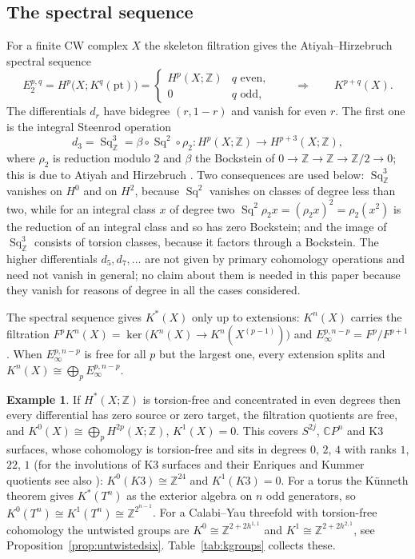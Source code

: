 \documentclass[reqno,11pt]{amsart}
\theoremstyle{definition}
\newtheorem{example}[theorem]{Example}
\newcommand{\ZZ}{\mathbb{Z}}
\newcommand{\CC}{\mathbb{C}}
\newcommand{\Sq}{\operatorname{Sq}}
\begin{document}
\subsection{The spectral sequence}
For a finite CW complex $X$ the skeleton filtration gives the Atiyah--Hirzebruch spectral sequence \cite{AH61}
\begin{equation}\label{eq:ahss}
E_2^{p,q}=H^p\bigl(X;K^q(\mathrm{pt})\bigr)=\begin{cases}H^p(X;\ZZ)&q\text{ even},\\ 0&q\text{ odd},\end{cases}\qquad\Longrightarrow\qquad K^{p+q}(X).
\end{equation}
The differentials $d_r$ have bidegree $(r,1-r)$ and vanish for even $r$. The first one is the integral Steenrod operation
\begin{equation}\label{eq:d3}
d_3=\Sq^3_\ZZ=\beta\circ\Sq^2\circ\rho_2\colon H^p(X;\ZZ)\longrightarrow H^{p+3}(X;\ZZ),
\end{equation}
where $\rho_2$ is reduction modulo $2$ and $\beta$ the Bockstein of $0\to\ZZ\to\ZZ\to\ZZ/2\to0$; this is due to Atiyah and Hirzebruch \cite{AH61}. Two consequences are used below: $\Sq^3_\ZZ$ vanishes on $H^0$ and on $H^2$, because $\Sq^2$ vanishes on classes of degree less than two, while for an integral class $x$ of degree two $\Sq^2\rho_2x=(\rho_2x)^2=\rho_2(x^2)$ is the reduction of an integral class and so has zero Bockstein; and the image of $\Sq^3_\ZZ$ consists of torsion classes, because it factors through a Bockstein. The higher differentials $d_5,d_7,\dots$ are not given by primary cohomology operations and need not vanish in general; no claim about them is needed in this paper because they vanish for reasons of degree in all the cases considered.

The spectral sequence gives $K^*(X)$ only up to extensions: $K^n(X)$ carries the filtration $F^pK^n(X)=\ker\bigl(K^n(X)\to K^n(X^{(p-1)})\bigr)$ and $E_\infty^{p,n-p}=F^p/F^{p+1}$. When $E_\infty^{p,n-p}$ is free for all $p$ but the largest one, every extension splits and $K^n(X)\cong\bigoplus_pE_\infty^{p,n-p}$.

\begin{example}\label{ex:even}
If $H^*(X;\ZZ)$ is torsion-free and concentrated in even degrees then every differential has zero source or zero target, the filtration quotients are free, and $K^0(X)\cong\bigoplus_pH^{2p}(X;\ZZ)$, $K^1(X)=0$. This covers $S^{2j}$, $\CC P^n$ and K3 surfaces, whose cohomology is torsion-free and sits in degrees $0$, $2$, $4$ with ranks $1$, $22$, $1$ \cite[Chapter~VIII]{BHPV04} (for the involutions of K3 surfaces and their Enriques and Kummer quotients see also \cite{BRB22,BN26}): $K^0(K3)\cong\ZZ^{24}$ and $K^1(K3)=0$. For a torus the K\"unneth theorem gives $K^*(T^n)$ as the exterior algebra on $n$ odd generators, so $K^0(T^n)\cong K^1(T^n)\cong\ZZ^{2^{n-1}}$. For a Calabi--Yau threefold with torsion-free cohomology the untwisted groups are $K^0\cong\ZZ^{2+2h^{1,1}}$ and $K^1\cong\ZZ^{2+2h^{2,1}}$, see Proposition~\ref{prop:untwistedsix}. Table~\ref{tab:kgroups} collects these.
\end{example}
\end{document}

